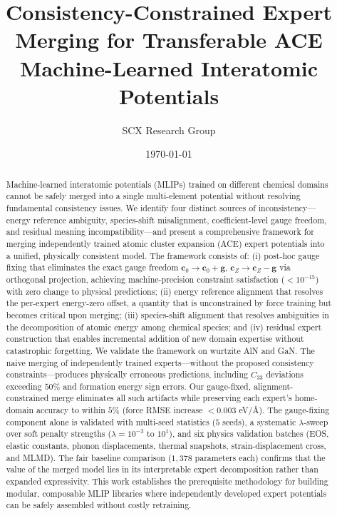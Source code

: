 \documentclass[twoside,prb,aps,floatfix,superscriptaddress,longbibliography]{revtex4-2}
\newcommand{\AAng}{\mbox{\AA}}
\newcommand{\g}{\mathbf{g}}
\newcommand{\cZ}{\mathbf{c}_{Z}}
\newcommand{\cb}{\mathbf{c}_{0}}
\begin{document}
\title{Consistency-Constrained Expert Merging for Transferable ACE \\
Machine-Learned Interatomic Potentials}

\author{SCX Research Group}

\date{\today}

\begin{abstract}
Machine-learned interatomic potentials (MLIPs) trained on different chemical domains cannot be safely merged into a single multi-element potential without resolving fundamental consistency issues. We identify four distinct sources of inconsistency---energy reference ambiguity, species-shift misalignment, coefficient-level gauge freedom, and residual meaning incompatibility---and present a comprehensive framework for merging independently trained atomic cluster expansion (ACE) expert potentials into a unified, physically consistent model. The framework consists of: (i) post-hoc gauge fixing that eliminates the exact gauge freedom $\cb \to \cb + \g$, $\cZ \to \cZ - \g$ via orthogonal projection, achieving machine-precision constraint satisfaction ($< 10^{-15}$) with zero change to physical predictions; (ii) energy reference alignment that resolves the per-expert energy-zero offset, a quantity that is unconstrained by force training but becomes critical upon merging; (iii) species-shift alignment that resolves ambiguities in the decomposition of atomic energy among chemical species; and (iv) residual expert construction that enables incremental addition of new domain expertise without catastrophic forgetting. We validate the framework on wurtzite AlN and GaN. The naive merging of independently trained experts---without the proposed consistency constraints---produces physically erroneous predictions, including $C_{33}$ deviations exceeding $50\%$ and formation energy sign errors. Our gauge-fixed, alignment-constrained merge eliminates all such artifacts while preserving each expert's home-domain accuracy to within $5\%$ (force RMSE increase $< 0.003$ eV/\AAng). The gauge-fixing component alone is validated with multi-seed statistics ($5$ seeds), a systematic $\lambda$-sweep over soft penalty strengths ($\lambda = 10^{-3}$ to $10^1$), and six physics validation batches (EOS, elastic constants, phonon displacements, thermal snapshots, strain-displacement cross, and MLMD). The fair baseline comparison ($1{,}378$ parameters each) confirms that the value of the merged model lies in its interpretable expert decomposition rather than expanded expressivity. This work establishes the prerequisite methodology for building modular, composable MLIP libraries where independently developed expert potentials can be safely assembled without costly retraining.
\end{abstract}
\end{document}
